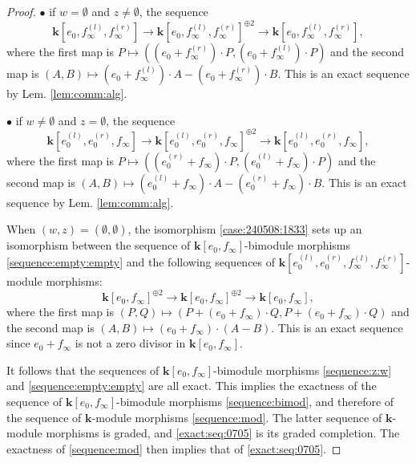 \documentclass[10pt,a4paper]{amsart}
\begin{document}
\begin{proof}
$\bullet$ if $w=\emptyset$ and $z\neq\emptyset$, the sequence 
$$
\mathbf k[e_0,f_\infty^{(l)},f_\infty^{(r)}]
\to \mathbf k[e_0,f_\infty^{(l)},f_\infty^{(r)}]^{\oplus 2}
\to \mathbf k[e_0,f_\infty^{(l)},f_\infty^{(r)}], 
$$
where the first map is $P\mapsto ((e_0+f_\infty^{(r)})\cdot P,(e_0+f_\infty^{(l)})\cdot P)$ 
and the second map is $(A,B)\mapsto (e_0+f_\infty^{(l)})\cdot A-(e_0+f_\infty^{(r)})\cdot B$. 
This is an exact sequence by Lem. \ref{lem:comm:alg}. 

$\bullet$ if $w\neq\emptyset$ and $z=\emptyset$, the sequence 
$$
\mathbf k[e_0^{(l)},e_0^{(r)},f_\infty]
\to \mathbf k[e_0^{(l)},e_0^{(r)},f_\infty]^{\oplus 2}
\to \mathbf k[e_0^{(l)},e_0^{(r)},f_\infty], 
$$
where the first map is $P\mapsto ((e_0^{(r)}+f_\infty)\cdot P,(e_0^{(l)}+f_\infty)\cdot P)$ 
and the second map is $(A,B)\mapsto (e_0^{(l)}+f_\infty)\cdot A-(e_0^{(r)}+f_\infty)\cdot B$. 
This is an exact sequence by Lem. \ref{lem:comm:alg}. 

When $(w,z)=(\emptyset,\emptyset)$, the isomorphism \eqref{case:240508:1833} sets up an isomorphism between the sequence 
of $\mathbf k[e_0,f_\infty]$-bimodule morphisms \eqref{sequence:empty:empty} and the following sequences of 
$\mathbf k[e_0^{(l)},e_0^{(r)},f_\infty^{(l)},f_\infty^{(r)}]$-module morphisms: 
$$
\mathbf k[e_0,f_\infty]^{\oplus 2}
\to \mathbf k[e_0,f_\infty]^{\oplus 2}
\to \mathbf k[e_0,f_\infty], 
$$
where the first map is $(P,Q)\mapsto (P+(e_0+f_\infty)\cdot Q,P+(e_0+f_\infty)\cdot Q)$ 
and the second map is $(A,B)\mapsto (e_0+f_\infty)\cdot (A-B)$. 
This is an exact sequence since $e_0+f_\infty$ is not a zero divisor in $\mathbf k[e_0,f_\infty]$. 

It follows that the sequences of $\mathbf k[e_0,f_\infty]$-bimodule morphisms  
\eqref{sequence:z:w} and \eqref{sequence:empty:empty} are all exact. This implies the exactness of  
the sequence of $\mathbf k[e_0,f_\infty]$-bimodule morphisms \eqref{sequence:bimod}, and therefore of  
the sequence of $\mathbf k$-module morphisms \eqref{sequence:mod}. The latter sequence of $\mathbf k$-module morphisms
is graded, and \eqref{exact:seq:0705} is its graded completion. The exactness of \eqref{sequence:mod} then 
implies that of \eqref{exact:seq:0705}. 
\end{proof}
\end{document}
